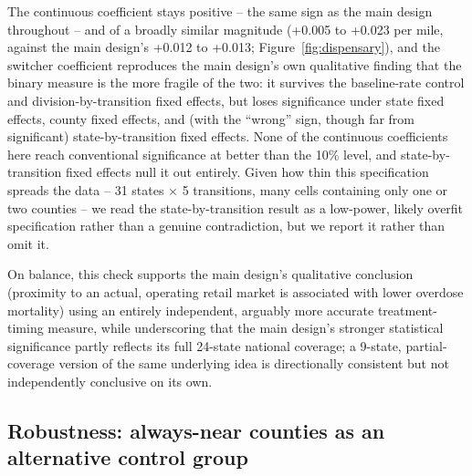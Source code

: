 \documentclass[preprint,12pt,authoryear]{elsarticle}
\begin{document}
The continuous coefficient stays positive -- the same sign as the main
design throughout -- and of a broadly similar magnitude (+0.005 to
+0.023 per mile, against the main design's +0.012 to +0.013;
Figure~\ref{fig:dispensary}), and the switcher coefficient reproduces
the main design's own qualitative finding that the binary measure is
the more fragile of the two: it survives the baseline-rate control and
division-by-transition fixed effects, but loses significance under
state fixed effects, county fixed effects, and (with the ``wrong''
sign, though far from significant) state-by-transition fixed effects.
None of the continuous coefficients here reach conventional
significance at better than the 10\% level, and state-by-transition
fixed effects null it out entirely. Given how thin this specification
spreads the data -- 31 states $\times$ 5 transitions, many cells
containing only one or two counties -- we read the state-by-transition
result as a low-power, likely overfit specification rather than a
genuine contradiction, but we report it rather than omit it.

On balance, this check supports the main design's qualitative
conclusion (proximity to an actual, operating retail market is
associated with lower overdose mortality) using an entirely
independent, arguably more accurate treatment-timing measure, while
underscoring that the main design's stronger statistical significance
partly reflects its full 24-state national coverage; a 9-state,
partial-coverage version of the same underlying idea is directionally
consistent but not independently conclusive on its own.

\subsection{Robustness: always-near counties as an alternative control group}
\label{sec:alwaysnear}
\end{document}
